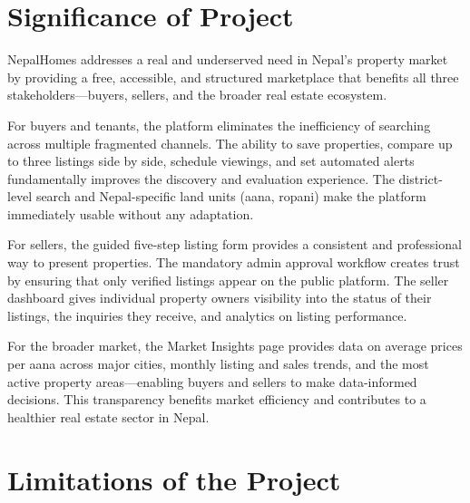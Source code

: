 \documentclass[12pt,a4paper]{report}
\begin{document}
\section{Significance of Project}

NepalHomes addresses a real and underserved need in Nepal's property market by
providing a free, accessible, and structured marketplace that benefits all three
stakeholders---buyers, sellers, and the broader real estate ecosystem.

For buyers and tenants, the platform eliminates the inefficiency of searching
across multiple fragmented channels. The ability to save properties, compare up
to three listings side by side, schedule viewings, and set automated alerts
fundamentally improves the discovery and evaluation experience. The district-level
search and Nepal-specific land units (aana, ropani) make the platform immediately
usable without any adaptation.

For sellers, the guided five-step listing form provides a consistent and
professional way to present properties. The mandatory admin approval workflow
creates trust by ensuring that only verified listings appear on the public
platform. The seller dashboard gives individual property owners visibility into
the status of their listings, the inquiries they receive, and analytics on
listing performance.

For the broader market, the Market Insights page provides data on average prices
per aana across major cities, monthly listing and sales trends, and the most
active property areas---enabling buyers and sellers to make data-informed
decisions. This transparency benefits market efficiency and contributes to a
healthier real estate sector in Nepal.

\section{Limitations of the Project}
\end{document}
